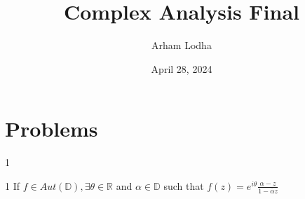 \documentclass{article}
\newcommand{\R}{\mathbb{R}}
\begin{document}
\title{Complex Analysis Final}
\author{Arham Lodha}%
\date{April 28, 2024}%
\maketitle

\section{Problems}

\begin{PROB}{1}\label{Problem 1.}
    
\end{PROB}
\begin{claim}{1}\label{Claim 1.}
    If $f \in Aut(\mathbb{D}), \exists \theta \in \R$ and $\alpha \in \mathbb{D}$ such that $f(z) = e^{i \theta} \frac{\alpha - z}{1 - \overline{\alpha}z}$   
\end{claim}
\end{document}

